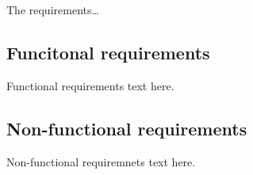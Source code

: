 \IEEEPARstart
{T}{he} requirements\dots

\subsection{Funcitonal requirements}
Functional requirements text here.

\subsection{Non-functional requirements}
Non-functional requiremnets text here.